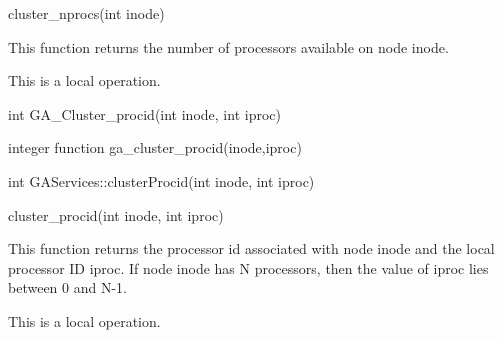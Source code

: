 \documentclass[12pt]{article}
\begin{document}
\begin{pyapi}
\begin{pycode}
cluster_nprocs(int inode) 
\end{pycode}
\end{pyapi}

\begin{desc}

This function returns the number of processors available on node inode.

This is a local operation.
\end{desc}


\begin{capi}
\begin{ccode}
int GA_Cluster_procid(int inode, int iproc)
\end{ccode}
\begin{funcargs}
\end{funcargs}
\end{capi}

\begin{fapi}
\begin{fcode}
integer function ga_cluster_procid(inode,iproc)
\end{fcode}
\begin{funcargs}
\end{funcargs}
\end{fapi}

\begin{cxxapi}
\begin{cxxcode}
int GAServices::clusterProcid(int inode, int iproc)
\end{cxxcode}
\begin{funcargs}
\end{funcargs}
\end{cxxapi}

\begin{pyapi}
\begin{pycode}
cluster_procid(int inode, int iproc)  
\end{pycode}
\end{pyapi} 


\begin{desc}

This function returns the processor id associated with node inode and 
the local processor ID iproc. If node inode has N processors, then the 
value of iproc lies between 0 and N-1.

This is a local operation.
\end{desc}
\end{document}
